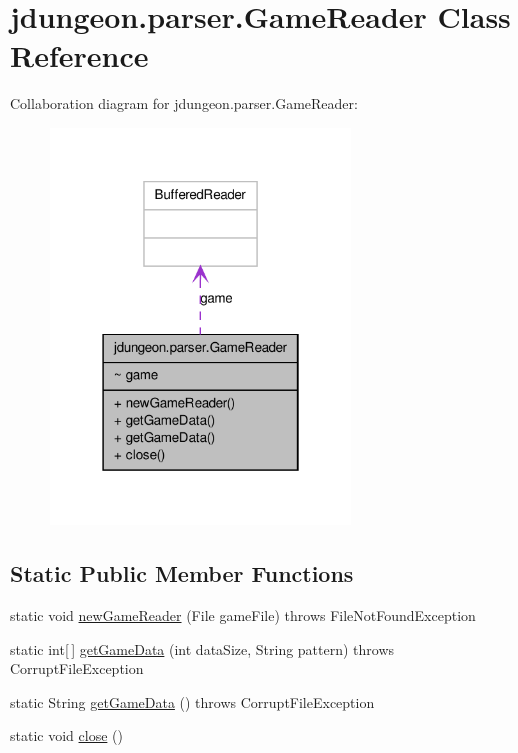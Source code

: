 \hypertarget{classjdungeon_1_1parser_1_1_game_reader}{
\section{jdungeon.parser.GameReader Class Reference}
\label{classjdungeon_1_1parser_1_1_game_reader}
}


Collaboration diagram for jdungeon.parser.GameReader:
\nopagebreak
\begin{figure}[H]
\begin{center}
\leavevmode
\includegraphics[width=226pt]{classjdungeon_1_1parser_1_1_game_reader__coll__graph}
\end{center}
\end{figure}
\subsection*{Static Public Member Functions}
\begin{DoxyCompactItemize}
\item 
static void \hyperlink{classjdungeon_1_1parser_1_1_game_reader_afa05cd68baf698bfc37dccc7156e7990}{newGameReader} (File gameFile)  throws FileNotFoundException 
\item 
static int\mbox{[}$\,$\mbox{]} \hyperlink{classjdungeon_1_1parser_1_1_game_reader_a8278eb6e4aa5796713b4a68efa54715e}{getGameData} (int dataSize, String pattern)  throws CorruptFileException 
\item 
static String \hyperlink{classjdungeon_1_1parser_1_1_game_reader_a807fc4acaf4d25f99be453a13ddc75f4}{getGameData} ()  throws CorruptFileException 
\item 
static void \hyperlink{classjdungeon_1_1parser_1_1_game_reader_a9e01057517fc3ecd76691a8594dd2b13}{close} ()
\end{DoxyCompactItemize}
